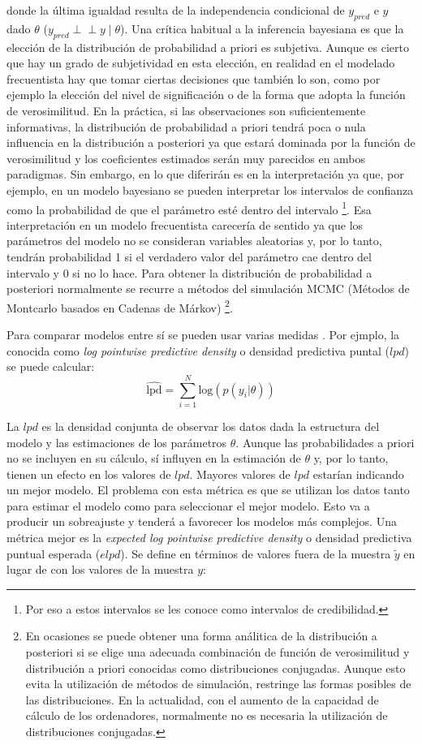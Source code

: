\documentclass[
  12pt,
  a4paper,
  extrafontsizes,
  onecolumn,
  openright]{memoir}
\begin{document}
donde la última igualdad resulta de la independencia condicional de
\(y_{pred}\) e \(y\) dado \(\theta\)
(\(y_{pred} \perp\!\!\!\perp y \mid \theta\)). Una crítica habitual a la
inferencia bayesiana es que la elección de la distribución de
probabilidad a priori es subjetiva. Aunque es cierto que hay un grado de
subjetividad en esta elección, en realidad en el modelado frecuentista
hay que tomar ciertas decisiones que también lo son, como por ejemplo la
elección del nivel de significación o de la forma que adopta la función
de verosimilitud. En la práctica, si las observaciones son
suficientemente informativas, la distribución de probabilidad a priori
tendrá poca o nula influencia en la distribución a posteriori ya que
estará dominada por la función de verosimilitud y los coeficientes
estimados serán muy parecidos en ambos paradigmas. Sin embargo, en lo
que diferirán es en la interpretación ya que, por ejemplo, en un modelo
bayesiano se pueden interpretar los intervalos de confianza como la
probabilidad de que el parámetro esté dentro del intervalo \footnote{Por
  eso a estos intervalos se les conoce como intervalos de credibilidad.}.
Esa interpretación en un modelo frecuentista carecería de sentido ya que
los parámetros del modelo no se consideran variables aleatorias y, por
lo tanto, tendrán probabilidad 1 si el verdadero valor del parámetro cae
dentro del intervalo y 0 si no lo hace. Para obtener la distribución de
probabilidad a posteriori normalmente se recurre a métodos del
simulación MCMC (Métodos de Montcarlo basados en Cadenas de Márkov)
\footnote{En ocasiones se puede obtener una forma análitica de la
  distribución a posteriori si se elige una adecuada combinación de
  función de verosimilitud y distribución a priori conocidas como
  distribuciones conjugadas. Aunque esto evita la utilización de métodos
  de simulación, restringe las formas posibles de las distribuciones. En
  la actualidad, con el aumento de la capacidad de cálculo de los
  ordenadores, normalmente no es necesaria la utilización de
  distribuciones conjugadas.}.

Para comparar modelos entre sí se pueden usar varias medidas
\autocite[ver][]{barreda2023}. Por ejmplo, la conocida como \emph{log
pointwise predictive density} o densidad predictiva puntal (\(lpd\)) se
puede calcular: \[
\widehat{\mathrm{lpd}} = \sum_{i=1}^{N} \mathrm{log} (p(y_{i} | \theta))
\]

La \(lpd\) es la densidad conjunta de observar los datos dada la
estructura del modelo y las estimaciones de los parámetros \(\theta\).
Aunque las probabilidades a priori no se incluyen en su cálculo, sí
influyen en la estimación de \(\theta\) y, por lo tanto, tienen un
efecto en los valores de \(lpd\). Mayores valores de \(lpd\) estarían
indicando un mejor modelo. El problema con esta métrica es que se
utilizan los datos tanto para estimar el modelo como para seleccionar el
mejor modelo. Esto va a producir un sobreajuste y tenderá a favorecer
los modelos más complejos. Una métrica mejor es la \emph{expected log
pointwise predictive density} o densidad predictiva puntual esperada
(\(elpd\)). Se define en términos de valores fuera de la muestra
\(\tilde{y}\) en lugar de con los valores de la muestra \(y\):
\end{document}
